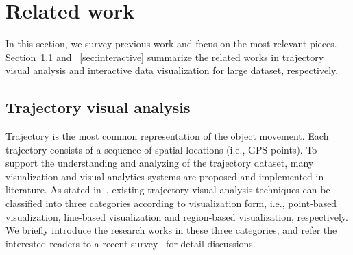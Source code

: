 \section{Related work}\label{sec:rel}
In this section, we survey previous work and focus on the most relevant pieces.
Section~\ref{sec:trajvisana} and ~\ref{sec:interactive} summarize the related works in trajectory visual analysis and interactive data visualization for large dataset, respectively.

\subsection{Trajectory visual analysis}\label{sec:trajvisana}
Trajectory is the most common representation of the object movement.
Each trajectory consists of a sequence of spatial locations (i.e., GPS points).
To support the understanding and analyzing of the trajectory dataset,
many visualization and visual analytics systems are proposed and implemented in literature.
As stated in~\cite{chen2015survey}, existing trajectory visual analysis techniques can be classified into three categories according to visualization form,
i.e., point-based visualization, line-based visualization and region-based visualization, respectively.
We briefly introduce the research works in these three categories, and refer the interested readers to a recent survey~\cite{chen2015survey} for detail discussions.

